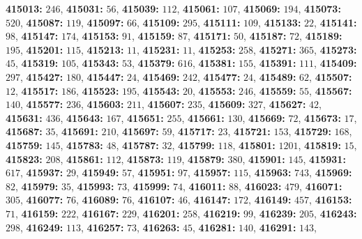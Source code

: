 \textsf{\bfseries 415013:} $246$, \textsf{\bfseries 415031:} $56$, \textsf{\bfseries 415039:} $112$, \textsf{\bfseries 415061:} $107$, \textsf{\bfseries 415069:} $194$, \textsf{\bfseries 415073:} $520$, \textsf{\bfseries 415087:} $119$, \textsf{\bfseries 415097:} $66$, \textsf{\bfseries 415109:} $295$, \textsf{\bfseries 415111:} $109$, \textsf{\bfseries 415133:} $22$, \textsf{\bfseries 415141:} $98$, \textsf{\bfseries 415147:} $174$, \textsf{\bfseries 415153:} $91$, \textsf{\bfseries 415159:} $87$, \textsf{\bfseries 415171:} $50$, \textsf{\bfseries 415187:} $72$, \textsf{\bfseries 415189:} $195$, \textsf{\bfseries 415201:} $115$, \textsf{\bfseries 415213:} $11$, \textsf{\bfseries 415231:} $11$, \textsf{\bfseries 415253:} $258$, \textsf{\bfseries 415271:} $365$, \textsf{\bfseries 415273:} $45$, \textsf{\bfseries 415319:} $105$, \textsf{\bfseries 415343:} $53$, \textsf{\bfseries 415379:} $616$, \textsf{\bfseries 415381:} $155$, \textsf{\bfseries 415391:} $111$, \textsf{\bfseries 415409:} $297$, \textsf{\bfseries 415427:} $180$, \textsf{\bfseries 415447:} $24$, \textsf{\bfseries 415469:} $242$, \textsf{\bfseries 415477:} $24$, \textsf{\bfseries 415489:} $62$, \textsf{\bfseries 415507:} $12$, \textsf{\bfseries 415517:} $186$, \textsf{\bfseries 415523:} $195$, \textsf{\bfseries 415543:} $20$, \textsf{\bfseries 415553:} $246$, \textsf{\bfseries 415559:} $55$, \textsf{\bfseries 415567:} $140$, \textsf{\bfseries 415577:} $236$, \textsf{\bfseries 415603:} $211$, \textsf{\bfseries 415607:} $235$, \textsf{\bfseries 415609:} $327$, \textsf{\bfseries 415627:} $42$, \textsf{\bfseries 415631:} $436$, \textsf{\bfseries 415643:} $167$, \textsf{\bfseries 415651:} $255$, \textsf{\bfseries 415661:} $130$, \textsf{\bfseries 415669:} $72$, \textsf{\bfseries 415673:} $17$, \textsf{\bfseries 415687:} $35$, \textsf{\bfseries 415691:} $210$, \textsf{\bfseries 415697:} $59$, \textsf{\bfseries 415717:} $23$, \textsf{\bfseries 415721:} $153$, \textsf{\bfseries 415729:} $168$, \textsf{\bfseries 415759:} $145$, \textsf{\bfseries 415783:} $48$, \textsf{\bfseries 415787:} $32$, \textsf{\bfseries 415799:} $118$, \textsf{\bfseries 415801:} $1201$, \textsf{\bfseries 415819:} $15$, \textsf{\bfseries 415823:} $208$, \textsf{\bfseries 415861:} $112$, \textsf{\bfseries 415873:} $119$, \textsf{\bfseries 415879:} $380$, \textsf{\bfseries 415901:} $145$, \textsf{\bfseries 415931:} $617$, \textsf{\bfseries 415937:} $29$, \textsf{\bfseries 415949:} $57$, \textsf{\bfseries 415951:} $97$, \textsf{\bfseries 415957:} $115$, \textsf{\bfseries 415963:} $743$, \textsf{\bfseries 415969:} $82$, \textsf{\bfseries 415979:} $35$, \textsf{\bfseries 415993:} $73$, \textsf{\bfseries 415999:} $74$, \textsf{\bfseries 416011:} $88$, \textsf{\bfseries 416023:} $479$, \textsf{\bfseries 416071:} $305$, \textsf{\bfseries 416077:} $76$, \textsf{\bfseries 416089:} $76$, \textsf{\bfseries 416107:} $46$, \textsf{\bfseries 416147:} $172$, \textsf{\bfseries 416149:} $457$, \textsf{\bfseries 416153:} $71$, \textsf{\bfseries 416159:} $222$, \textsf{\bfseries 416167:} $229$, \textsf{\bfseries 416201:} $258$, \textsf{\bfseries 416219:} $99$, \textsf{\bfseries 416239:} $205$, \textsf{\bfseries 416243:} $298$, \textsf{\bfseries 416249:} $113$, \textsf{\bfseries 416257:} $73$, \textsf{\bfseries 416263:} $45$, \textsf{\bfseries 416281:} $140$, \textsf{\bfseries 416291:} $143$, 
